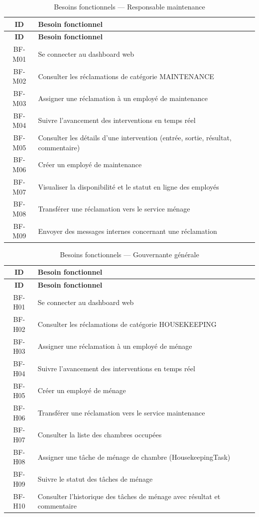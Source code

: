 \begin{longtable}{|c|p{12cm}|}
\caption{Besoins fonctionnels — Responsable maintenance} \label{tab:bf_maintenance_mgr} \\
\hline
\textbf{ID} & \textbf{Besoin fonctionnel} \\
\hline
\endfirsthead
\hline
\textbf{ID} & \textbf{Besoin fonctionnel} \\
\hline
\endhead
BF-M01 & Se connecter au dashboard web \\
\hline
BF-M02 & Consulter les réclamations de catégorie MAINTENANCE \\
\hline
BF-M03 & Assigner une réclamation à un employé de maintenance \\
\hline
BF-M04 & Suivre l'avancement des interventions en temps réel \\
\hline
BF-M05 & Consulter les détails d'une intervention (entrée, sortie, résultat, commentaire) \\
\hline
BF-M06 & Créer un employé de maintenance \\
\hline
BF-M07 & Visualiser la disponibilité et le statut en ligne des employés \\
\hline
BF-M08 & Transférer une réclamation vers le service ménage \\
\hline
BF-M09 & Envoyer des messages internes concernant une réclamation \\
\hline
\end{longtable}

\begin{longtable}{|c|p{12cm}|}
\caption{Besoins fonctionnels — Gouvernante générale} \label{tab:bf_housekeeping_mgr} \\
\hline
\textbf{ID} & \textbf{Besoin fonctionnel} \\
\hline
\endfirsthead
\hline
\textbf{ID} & \textbf{Besoin fonctionnel} \\
\hline
\endhead
BF-H01 & Se connecter au dashboard web \\
\hline
BF-H02 & Consulter les réclamations de catégorie HOUSEKEEPING \\
\hline
BF-H03 & Assigner une réclamation à un employé de ménage \\
\hline
BF-H04 & Suivre l'avancement des interventions en temps réel \\
\hline
BF-H05 & Créer un employé de ménage \\
\hline
BF-H06 & Transférer une réclamation vers le service maintenance \\
\hline
BF-H07 & Consulter la liste des chambres occupées \\
\hline
BF-H08 & Assigner une tâche de ménage de chambre (HousekeepingTask) \\
\hline
BF-H09 & Suivre le statut des tâches de ménage \\
\hline
BF-H10 & Consulter l'historique des tâches de ménage avec résultat et commentaire \\
\hline
\end{longtable}


